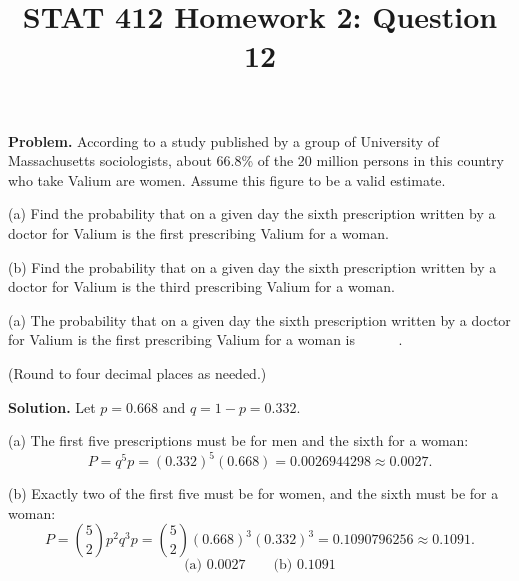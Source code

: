 \documentclass[11pt]{article}
\title{STAT 412 Homework 2: Question 12}
\author{}
\date{}
\begin{document}
\maketitle
\textbf{Problem.} According to a study published by a group of University of
Massachusetts sociologists, about 66.8\% of the 20 million persons in this
country who take Valium are women. Assume this figure to be a valid estimate.

(a) Find the probability that on a given day the sixth prescription written by
a doctor for Valium is the first prescribing Valium for a woman.

(b) Find the probability that on a given day the sixth prescription written by
a doctor for Valium is the third prescribing Valium for a woman.

(a) The probability that on a given day the sixth prescription written by a
doctor for Valium is the first prescribing Valium for a woman is
\(\boxed{\phantom{0.0000}}\).

(Round to four decimal places as needed.)

\textbf{Solution.} Let \(p=0.668\) and \(q=1-p=0.332\).

(a) The first five prescriptions must be for men and the sixth for a woman:
\[
P=q^5p=(0.332)^5(0.668)=0.0026944298\approx0.0027.
\]

(b) Exactly two of the first five must be for women, and the sixth must be for a woman:
\[
P=\binom52p^2q^3p=\binom52(0.668)^3(0.332)^3
=0.1090796256\approx0.1091.
\]
\[
\boxed{\text{(a) }0.0027\qquad\text{(b) }0.1091}
\]
\end{document}
